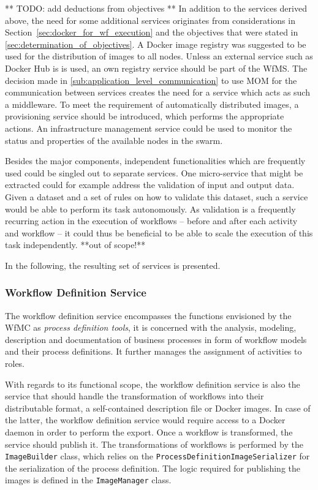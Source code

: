   ** TODO: add deductions from objectives **
  In addition to the services derived above, the need for some additional services originates from considerations in Section~\ref{sec:docker_for_wf_execution} and the objectives that were stated in \ref{sec:determination_of_objectives}.
  A Docker image registry was suggested to be used for the distribution of images to all nodes. Unless an external service such as Docker Hub is is used, an own registry service should be part of the \ac{WfMS}.
  The decision made in \ref{sub:application_level_communication} to use \ac{MOM} for the communication between services creates the need for a service which acts as such a middleware.
  To meet the requirement of automatically distributed images, a provisioning service should be introduced, which performs the appropriate actions. An infrastructure management service could be used to monitor the status and properties of the available nodes in the swarm.

  Besides the major components, independent functionalities which are frequently used could be singled out to separate services.
  One micro-service that might be extracted could for example address the validation of input and output data. Given a dataset and a set of rules on how to validate this dataset, such a service would be able to perform its task autonomously. As validation is a frequently recurring action in the execution of workflows -- before and after each activity and workflow -- it could thus be beneficial to be able to scale the execution of this task independently. **out of scope!**

  In the following, the resulting set of services is presented.

  \subsubsection{Workflow Definition Service} %
    \label{subs:workflow_definition_service}

    The workflow definition service encompasses the functions envisioned by the \ac{WfMC} as \emph{process definition tools}, \ie it is concerned with the analysis, modeling, description and documentation of business processes in form of workflow models and their process definitions. It further manages the assignment of activities to roles.

    With regards to its functional scope, the workflow definition service is also the service that should handle the transformation of workflows into their distributable format, \eg a self-contained description file or Docker images. In case of the latter, the workflow definition service would require access to a Docker daemon in order to perform the export. Once a workflow is transformed, the service should publish it. The transformations of workflows is performed by the \texttt{ImageBuilder} class, which relies on the \texttt{ProcessDefinitionImageSerializer} for the serialization of the process definition. The logic required for publishing the images is defined in the \texttt{ImageManager} class.

